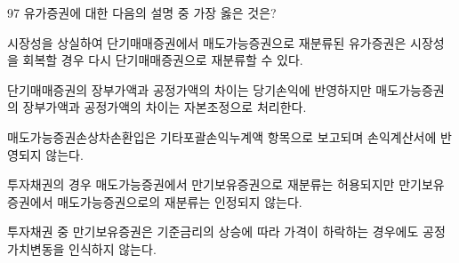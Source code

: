\begin{question}{97}
유가증권에 대한 다음의 설명 중 가장 옳은 것은?
\begin{choices}
  \item 시장성을 상실하여 단기매매증권에서 매도가능증권으로 재분류된 유가증권은 시장성을 회복할 경우 다시 단기매매증권으로 재분류할 수 있다.
  \item 단기매매증권의 장부가액과 공정가액의 차이는 당기손익에 반영하지만 매도가능증권의 장부가액과 공정가액의 차이는 자본조정으로 처리한다.
  \item 매도가능증권손상차손환입은 기타포괄손익누계액 항목으로 보고되며 손익계산서에 반영되지 않는다.
  \item 투자채권의 경우 매도가능증권에서 만기보유증권으로 재분류는 허용되지만 만기보유증권에서 매도가능증권으로의 재분류는 인정되지 않는다.
  \item 투자채권 중 만기보유증권은 기준금리의 상승에 따라 가격이 하락하는 경우에도 공정가치변동을 인식하지 않는다.
\end{choices}
\end{question}
